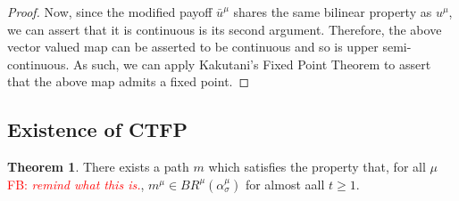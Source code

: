 \documentclass{article}
\theoremstyle{definition}
\newtheorem{theorem}{Theorem}
\newcommand{\fb}[1]{\textcolor{red}{FB: \textit{#1}}}
\begin{document}
\begin{proof}
    Now, since the modified payoff $\bar{u}^\mu$ shares the same bilinear property as $u^\mu$, we can assert that it is continuous is its second argument. Therefore, the above vector valued map can be asserted to be continuous and so is upper semi-continuous. As such, we can apply Kakutani's Fixed Point Theorem to assert that the above map admits a fixed point.

  \end{proof}

\subsection{Existence of CTFP}

  \begin{theorem}
    There exists a path $m$ which satisfies the property that, for all $\mu$ \fb{remind what this is.}, $m^\mu \in
    BR^\mu(\alpha_\sigma^\mu)$ for almost aall $t \geq 1$.
  \end{theorem}
\end{document}
